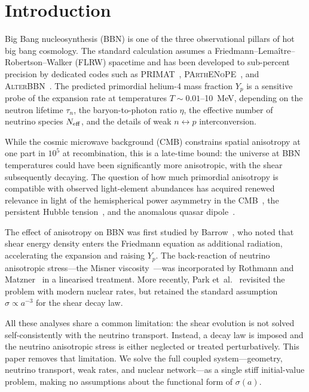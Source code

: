 \documentclass[a4paper,11pt]{article}
\newcommand{\Yp}{Y_p}
\newcommand{\Neff}{N_{\rm eff}}
\begin{document}
\section{Introduction}\label{sec:intro}

Big Bang nucleosynthesis (BBN) is one of the three observational pillars of hot big bang cosmology.  The standard calculation assumes a Friedmann--Lema\^itre--Robertson--Walker (FLRW) spacetime and has been developed to sub-percent precision by dedicated codes such as PRIMAT~\cite{PitrouPRIMAT2021}, \textsc{PArthENoPE}~\cite{PArthENoPE2018}, and \textsc{AlterBBN}~\cite{AlterBBN2020}.  The predicted primordial helium-4 mass fraction $\Yp$ is a sensitive probe of the expansion rate at temperatures $T \sim 0.01$--10~MeV, depending on the neutron lifetime $\tau_n$, the baryon-to-photon ratio $\eta$, the effective number of neutrino species $\Neff$, and the details of weak $n\leftrightarrow p$ interconversion.

While the cosmic microwave background (CMB) constrains spatial anisotropy at one part in $10^5$ at recombination, this is a late-time bound: the universe at BBN temperatures could have been significantly more anisotropic, with the shear subsequently decaying.  The question of how much primordial anisotropy is compatible with observed light-element abundances has acquired renewed relevance in light of the hemispherical power asymmetry in the CMB~\cite{Planck2020anomalies}, the persistent Hubble tension~\cite{Riess2022}, and the anomalous quasar dipole~\cite{Secrest2022}.

The effect of anisotropy on BBN was first studied by Barrow~\cite{Barrow1976}, who noted that shear energy density enters the Friedmann equation as additional radiation, accelerating the expansion and raising $\Yp$.  The back-reaction of neutrino anisotropic stress---the Misner viscosity~\cite{Misner1968}---was incorporated by Rothmann and Matzner~\cite{RothmannMatzner1984} in a linearised treatment.  More recently, Park et~al.~\cite{Park2025} revisited the problem with modern nuclear rates, but retained the standard assumption $\sigma \propto a^{-3}$ for the shear decay law.

All these analyses share a common limitation: the shear evolution is not solved self-consistently with the neutrino transport.  Instead, a decay law is imposed and the neutrino anisotropic stress is either neglected or treated perturbatively.  This paper removes that limitation.  We solve the full coupled system---geometry, neutrino transport, weak rates, and nuclear network---as a single stiff initial-value problem, making no assumptions about the functional form of $\sigma(a)$.
\end{document}
